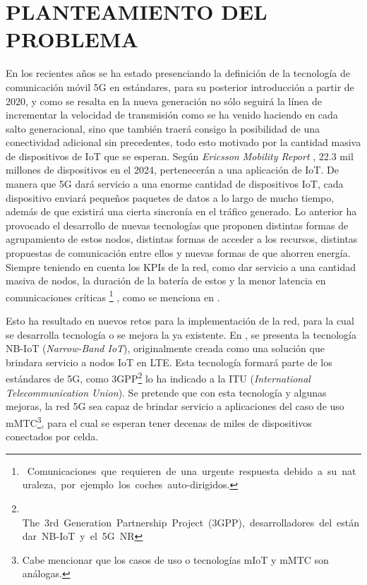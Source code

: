 
\section{PLANTEAMIENTO DEL PROBLEMA}

En los recientes años se ha estado presenciando la definición de la tecnología de comunicación móvil 5G en estándares, para su posterior introducción a partir de 2020, y como se resalta en \parencite{Fettweis2016} la nueva generación no sólo seguirá la línea de incrementar la velocidad de transmisión como se ha venido haciendo en cada salto generacional, sino que también traerá consigo la posibilidad de una conectividad adicional sin precedentes, todo esto motivado por la cantidad masiva de dispositivos de IoT que se esperan. Según \textit{Ericsson Mobility Report} \parencite{Ericsson2019}, 22.3 mil millones de dispositivos en el 2024, pertenecerán a una aplicación de IoT. De manera que 5G dará servicio a una enorme cantidad de dispositivos IoT, cada dispositivo enviará pequeños paquetes de datos a lo largo de mucho tiempo, además de que existirá una cierta sincronía en el tráfico generado. Lo anterior ha provocado el desarrollo de nuevas tecnologías que proponen distintas formas de agrupamiento de estos nodos, distintas formas de acceder a los recursos, distintas propuestas de comunicación entre ellos y nuevas formas de que ahorren energía. Siempre teniendo en cuenta los KPIs de la red, como dar servicio a una cantidad masiva de nodos, la duración de la batería de estos y la menor latencia en comunicaciones críticas \footnote{\ Comunicaciones\ que\ requieren\ de\ una\ urgente\ respuesta\ debido\ a\ su\ naturaleza,\ por\ ejemplo\ los\ coches\ auto-dirigidos.} , como se menciona en \parencite{NGMN}.\newline

Esto ha resultado en nuevos retos para la implementación de la red, para la cual se desarrolla tecnología o se mejora la ya existente. En \parencite{GSMAssociation2019}, se presenta la tecnología NB-IoT (\textit{Narrow-Band IoT}), originalmente creada como una solución que brindara servicio a nodos IoT en LTE. Esta tecnología formará parte de los estándares de 5G, como 3GPP\footnote{\ $  $The\ 3rd\ Generation\ Partnership\ Project\ (3GPP),\ desarrolladores\ del\ est\textrm{\'{a}}ndar\ NB-IoT\ y\ el\ 5G\ NR}
lo ha indicado a la ITU (\textit{International Telecommunication Union}). Se pretende que con esta tecnología y algunas mejoras, la red 5G sea capaz de brindar servicio a aplicaciones del caso de uso mMTC\footnote{Cabe mencionar que los casos de uso o tecnologías mIoT y mMTC son análogas.}, para el cual se esperan tener decenas de miles de dispositivos conectados por celda. \newline

